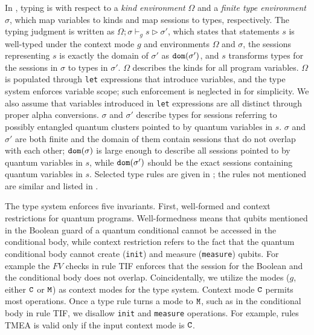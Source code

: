 In \qafny, typing is with respect to a \emph{kind environment} $\Omega$ and a \emph{finite type environment} $\sigma$,
which map \qafny variables to kinds and map sessions to types, respectively.
The typing judgment is written as $\Omega; \sigma\vdash_{g} s \triangleright \sigma'$,
which states that statements $s$ is well-typed under the context mode $g$ and environments $\Omega$ and $\sigma$,
the sessions representing $s$ is exactly the domain of $\sigma'$ as $\mathtt{dom}(\sigma')$,
and $s$ transforms types for the sessions in $\sigma$ to types in $\sigma'$.
$\Omega$ describes the kinds for all program variables.
$\Omega$ is populated through \texttt{let} expressions that introduce variables,
and the \qafny type system enforces variable scope; such enforcement is neglected in  for simplicity.
We also assume that variables introduced in \texttt{let} expressions are all distinct through proper alpha conversions.
$\sigma$ and $\sigma'$ describe types for sessions referring to possibly entangled quantum clusters pointed to by quantum variables in $s$. 
$\sigma$ and $\sigma'$ are both finite and the domain of them contain sessions that do not overlap with each other; $\mathtt{dom}(\sigma)$ is large enough to describe all sessions pointed to by quantum variables in $s$,
while $\mathtt{dom}(\sigma')$ should be the exact sessions containing quantum variables in $s$.
Selected type rules are given in ; the rules not mentioned are similar and listed in .

The type system enforces five invariants.  First, well-formed and context restrictions for quantum programs.
Well-formedness means that qubits mentioned in the Boolean guard of a quantum conditional cannot be accessed in the conditional body,
while context restriction refers to the fact that the quantum conditional body cannot create (\texttt{init}) and measure (\texttt{measure}) qubits. 
For example the $FV$ checks in rule \textsc{TIF} enforces that the session for the Boolean and the conditional body does not overlap.
Coincidentally, we utilize the modes ($g$, either $\texttt{C}$ or $\texttt{M}$) as context modes for the type system. 
Context mode $\texttt{C}$ permits most \qafny operations. Once a type rule turns a mode to $\texttt{M}$, such as in the conditional body in rule \textsc{TIF}, we disallow \texttt{init} and \texttt{measure} operations. For example, rules \textsc{TMEA} is valid only if the input context mode is $\texttt{C}$.

